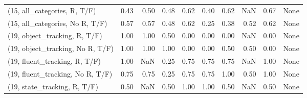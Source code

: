 \begin{table*}[h!]
\begin{adjustbox}{width=2\columnwidth,center}
\begin{tabular}{lrrr|rrr|rrr}
(15, all\_categories, R, T/F)          &                      0.43 &                  0.50 &                      0.48 &                          0.62 &                      0.40 &                          0.62 &                                    NaN &                               0.67 &                                  None \\
(15, all\_categories, No R, T/F)       &                      0.57 &                  0.57 &                      0.48 &                          0.62 &                      0.25 &                          0.38 &                                   0.52 &                               0.62 &                                  None \\



\midrule
(19, object\_tracking, R, T/F)         &                      1.00 &                  1.00 &                      0.50 &                          0.00 &                      0.00 &                          0.00 &                                    NaN &                               0.00 &                                  None \\
(19, object\_tracking, No R, T/F)      &                      1.00 &                  1.00 &                      1.00 &                          0.00 &                      0.00 &                          0.50 &                                   0.50 &                               0.00 &                                  None \\
(19, fluent\_tracking, R, T/F)         &                      1.00 &                   NaN &                      0.25 &                          0.75 &                      0.75 &                          0.75 &                                    NaN &                               1.00 &                                  None \\
(19, fluent\_tracking, No R, T/F)      &                      0.75 &                  0.75 &                      0.25 &                          0.75 &                      0.75 &                          1.00 &                                   0.50 &                               1.00 &                                  None \\
(19, state\_tracking, R, T/F)          &                      0.50 &                   NaN &                      0.50 &                          1.00 &                      1.00 &                          0.50 &                                    NaN &                               0.50 &                                  None \\

\end{tabular}
\end{adjustbox}
\end{table*}
